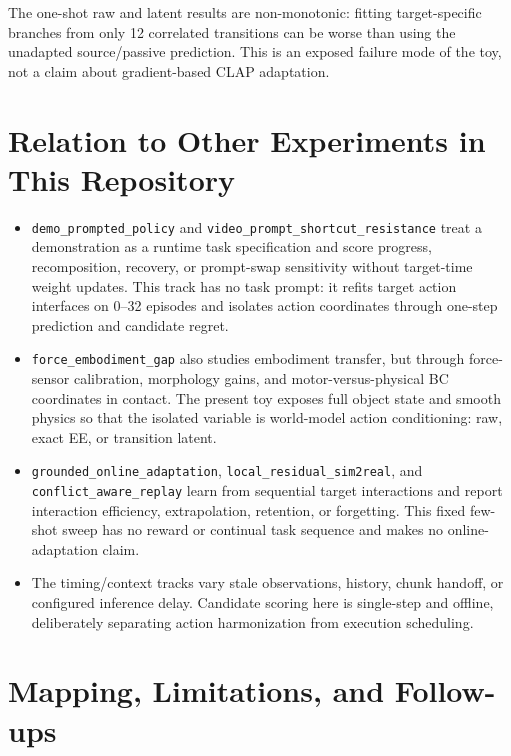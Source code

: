 \documentclass[11pt]{article}
\begin{document}
The one-shot raw and latent results are non-monotonic: fitting target-specific branches from only 12 correlated transitions can be worse than using the unadapted source/passive prediction. This is an exposed failure mode of the toy, not a claim about gradient-based CLAP adaptation.

\section{Relation to Other Experiments in This Repository}

\begin{itemize}[leftmargin=1.5em]
  \item \texttt{demo\_prompted\_policy} and \texttt{video\_prompt\_shortcut\_resistance} treat a demonstration as a runtime task specification and score progress, recomposition, recovery, or prompt-swap sensitivity without target-time weight updates. This track has no task prompt: it refits target action interfaces on 0--32 episodes and isolates action coordinates through one-step prediction and candidate regret.
  \item \texttt{force\_embodiment\_gap} also studies embodiment transfer, but through force-sensor calibration, morphology gains, and motor-versus-physical BC coordinates in contact. The present toy exposes full object state and smooth physics so that the isolated variable is world-model action conditioning: raw, exact EE, or transition latent.
  \item \texttt{grounded\_online\_adaptation}, \texttt{local\_residual\_sim2real}, and \texttt{conflict\_aware\_replay} learn from sequential target interactions and report interaction efficiency, extrapolation, retention, or forgetting. This fixed few-shot sweep has no reward or continual task sequence and makes no online-adaptation claim.
  \item The timing/context tracks vary stale observations, history, chunk handoff, or configured inference delay. Candidate scoring here is single-step and offline, deliberately separating action harmonization from execution scheduling.
\end{itemize}

\section{Mapping, Limitations, and Follow-ups}
\end{document}
